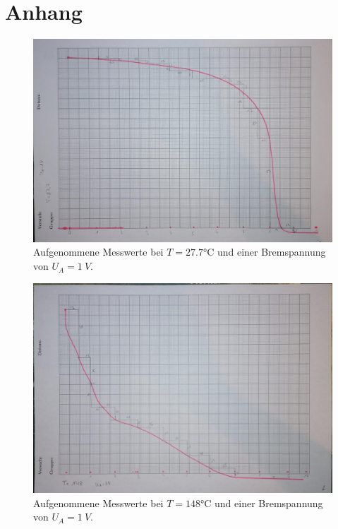 \section{Anhang}
\begin{figure}[H]
    \centering
    \includegraphics[scale=0.25]{content/Kurve27.jpg}
    \caption{Aufgenommene Messwerte bei $T = 27.7\unit{\degreeCelsius}$ und einer Bremspannung von $U_A = \qty{1}{V}$.}
    \label{fig:27}
\end{figure}

\begin{figure}[H]
    \centering
    \includegraphics[scale=0.25]{content/Kurve148.jpg}
    \caption{Aufgenommene Messwerte bei $T = 148 \unit{\degreeCelsius}$ und einer Bremspannung von $U_A = \qty{1}{V}$.}
    \label{fig:148}
\end{figure}

